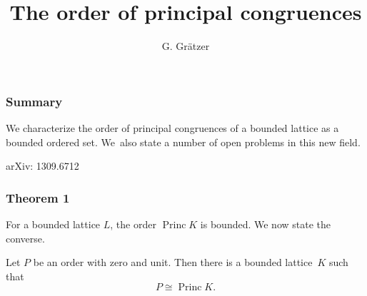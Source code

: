 \documentclass[leqno]{beamer}
\DeclareMathOperator{\Princ}{Princ}
\begin{document}
 
\title{The order of principal congruences}
\author{G. Gr\"atzer}
\date{}
\maketitle 

\begin{frame}
\frametitle{Summary}
We characterize the order of principal congruences 
of a bounded lattice 
as a bounded ordered set.
We~also state a number of open problems in this new field.
\medskip 
 
arXiv: 1309.6712 
\end{frame}

\begin{frame}
\frametitle{Theorem 1}
For a bounded lattice $L$, the order $\Princ K$ is bounded. 
We now state the converse.
\pause
\begin{theorem}
Let $P$ be an order with zero and unit.
Then there is a bounded lattice~$K$ such that
\[
   P \cong \Princ K.
\]
\end{theorem}
\end{frame}
\end{document}
